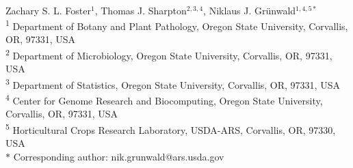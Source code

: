 \documentclass[10pt,letterpaper]{article}
\date{}
\begin{document}
\vspace*{0.35in}

\begin{flushleft}
{\Large
\textbf{}
}
\newline
\\

  Zachary S. L. Foster${}^1$, Thomas J. Sharpton${}^{2,3,4}$, Niklaus J. Gr\"unwald${}^{1,4,5\ast}$
\\
\textsuperscript{1} Department of Botany and Plant Pathology, Oregon State University, Corvallis, OR, 97331, USA
\\
\textsuperscript{2} Department of Microbiology, Oregon State University, Corvallis, OR, 97331, USA
\\
\textsuperscript{3} Department of Statistics, Oregon State University, Corvallis, OR, 97331, USA
\\
\textsuperscript{4} Center for Genome Research and Biocomputing, Oregon State University, Corvallis, OR, 97331, USA
\\
\textsuperscript{5} Horticultural Crops Research Laboratory, USDA-ARS, Corvallis, OR, 97330, USA
\\
$\ast$ Corresponding author: nik.grunwald@ars.usda.gov

\bigskip


%
%






\end{flushleft}
\end{document}
